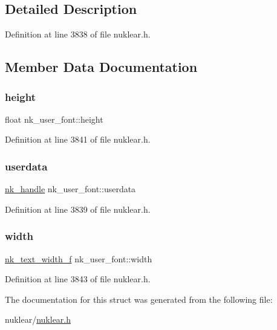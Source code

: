 \subsection{Detailed Description}


Definition at line 3838 of file nuklear.\+h.



\subsection{Member Data Documentation}
\mbox{\label{structnk__user__font_ab98ed37df408e0c2febfe448897ccf82}} 
\subsubsection{\texorpdfstring{height}{height}}
{\footnotesize\ttfamily float nk\+\_\+user\+\_\+font\+::height}



Definition at line 3841 of file nuklear.\+h.

\mbox{\label{structnk__user__font_a227c31a1ef360c78c98678d8d8546c03}} 
\subsubsection{\texorpdfstring{userdata}{userdata}}
{\footnotesize\ttfamily \mbox{\hyperlink{unionnk__handle}{nk\+\_\+handle}} nk\+\_\+user\+\_\+font\+::userdata}



Definition at line 3839 of file nuklear.\+h.

\mbox{\label{structnk__user__font_aac686ca3e72208ddfb982caa7c89293a}} 
\subsubsection{\texorpdfstring{width}{width}}
{\footnotesize\ttfamily \mbox{\hyperlink{nuklear_8h_a980ba414f6e3d6490236a688e7b51b1a}{nk\+\_\+text\+\_\+width\+\_\+f}} nk\+\_\+user\+\_\+font\+::width}



Definition at line 3843 of file nuklear.\+h.



The documentation for this struct was generated from the following file\+:\begin{DoxyCompactItemize}
\item 
nuklear/\mbox{\hyperlink{nuklear_8h}{nuklear.\+h}}\end{DoxyCompactItemize}
